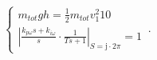 \begin{equation}
    \begin{cases}
      m_{tot} g h = \frac{1}{2} m_{tot} v_1^2 10\\
      \left\lvert\frac{k_{p\omega}s+k_{i\omega}}{s}\cdot\frac{1}{Ts+1}\right\rvert_{S=\mathrm{j}\cdot2\pi}=1
    \end{cases}\,.
\end{equation}